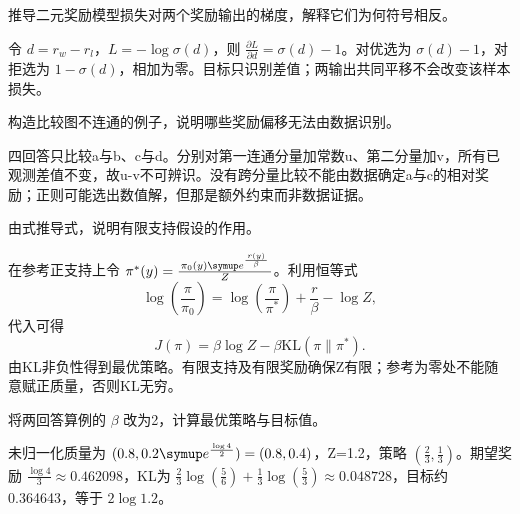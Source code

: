 
\begin{exercises}
\begin{exercise} 推导二元奖励模型损失对两个奖励输出的梯度，解释它们为何符号相反。

\begin{solution}
令 $d=r_w-r_l$，$L=-\log\sigma(d)$，则 $\frac{\partial L}{\partial d}=\sigma(d)-1$。对优选为 $\sigma(d)-1$，对拒选为 $1-\sigma(d)$，相加为零。目标只识别差值；两输出共同平移不会改变该样本损失。
\end{solution}
\end{exercise}

\begin{exercise}\optional 构造比较图不连通的例子，说明哪些奖励偏移无法由数据识别。

\begin{solution}
四回答只比较a与b、c与d。分别对第一连通分量加常数u、第二分量加v，所有已观测差值不变，故u-v不可辨识。没有跨分量比较不能由数据确定a与c的相对奖励；正则可能选出数值解，但那是额外约束而非数据证据。
\end{solution}
\end{exercise}

\begin{exercise} 由式推导式，说明有限支持假设的作用。

\begin{solution}
在参考正支持上令 $\pi^*(y)=\frac{\pi_0(y)\conste{}^{\frac{r(y)}{\beta}}}{Z}$。利用恒等式
\[
\log(\frac{\pi}{\pi_0})=\log(\frac{\pi}{\pi^*})+\frac{r}{\beta}-\log Z,
\]
代入可得
\[
J(\pi)=\beta\log Z-\beta\mathrm{KL}(\pi\|\pi^*).
\]
由KL非负性得到最优策略。有限支持及有限奖励确保Z有限；参考为零处不能随意赋正质量，否则KL无穷。
\end{solution}
\end{exercise}

\begin{exercise} 将两回答算例的 $\beta$ 改为2，计算最优策略与目标值。

\begin{solution}
未归一化质量为 $(0.8,0.2\conste{}^{\frac{\log4}{2}})=(0.8,0.4)$，Z=1.2，策略 $(\frac{2}{3},\frac{1}{3})$。期望奖励 $\frac{\log4}{3}\approx0.462098$，KL为 $\frac23\log(\frac{5}{6})+\frac13\log(\frac{5}{3})\approx0.048728$，目标约0.364643，等于 $2\log1.2$。
\end{solution}
\end{exercise}


\end{exercises}
